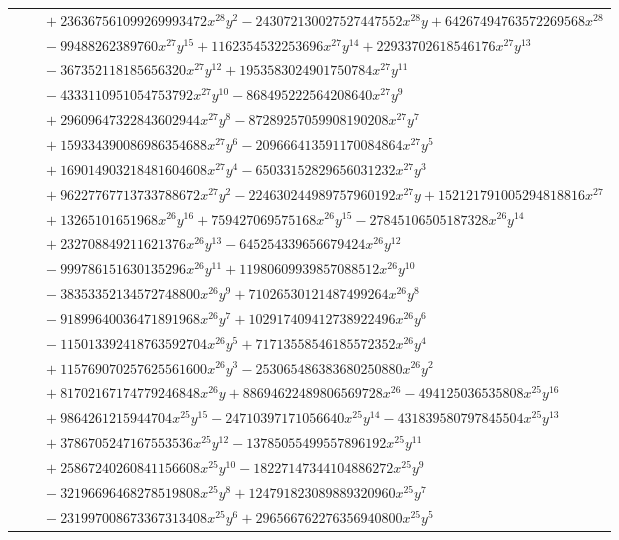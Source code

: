 \documentclass[11pt]{article}
\begin{document}
\begin{longtable}{@{}ll@{}}
 & $\quad +236367561099269993472x^{28}y^{2}-243072130027527447552x^{28}y+64267494763572269568x^{28}$\\
 & $\quad -99488262389760x^{27}y^{15}+1162354532253696x^{27}y^{14}+22933702618546176x^{27}y^{13}$\\
 & $\quad -367352118185656320x^{27}y^{12}+1953583024901750784x^{27}y^{11}$\\
 & $\quad -4333110951054753792x^{27}y^{10}-868495222564208640x^{27}y^{9}$\\
 & $\quad +29609647322843602944x^{27}y^{8}-87289257059908190208x^{27}y^{7}$\\
 & $\quad +159334390086986354688x^{27}y^{6}-209666413591170084864x^{27}y^{5}$\\
 & $\quad +169014903218481604608x^{27}y^{4}-65033152829656031232x^{27}y^{3}$\\
 & $\quad +96227767713733788672x^{27}y^{2}-224630244989757960192x^{27}y+152121791005294818816x^{27}$\\
 & $\quad +13265101651968x^{26}y^{16}+759427069575168x^{26}y^{15}-27845106505187328x^{26}y^{14}$\\
 & $\quad +232708849211621376x^{26}y^{13}-645254339656679424x^{26}y^{12}$\\
 & $\quad -999786151630135296x^{26}y^{11}+11980609939857088512x^{26}y^{10}$\\
 & $\quad -38353352134572748800x^{26}y^{9}+71026530121487499264x^{26}y^{8}$\\
 & $\quad -91899640036471891968x^{26}y^{7}+102917409412738922496x^{26}y^{6}$\\
 & $\quad -115013392418763592704x^{26}y^{5}+71713558546185572352x^{26}y^{4}$\\
 & $\quad +115769070257625561600x^{26}y^{3}-253065486383680250880x^{26}y^{2}$\\
 & $\quad +81702167174779246848x^{26}y+88694622489806569728x^{26}-494125036535808x^{25}y^{16}$\\
 & $\quad +9864261215944704x^{25}y^{15}-24710397171056640x^{25}y^{14}-431839580797845504x^{25}y^{13}$\\
 & $\quad +3786705247167553536x^{25}y^{12}-13785055499557896192x^{25}y^{11}$\\
 & $\quad +25867240260841156608x^{25}y^{10}-18227147344104886272x^{25}y^{9}$\\
 & $\quad -32196696468278519808x^{25}y^{8}+124791823089889320960x^{25}y^{7}$\\
 & $\quad -231997008673367313408x^{25}y^{6}+296566762276356940800x^{25}y^{5}$\\

\end{longtable}
\end{document}
